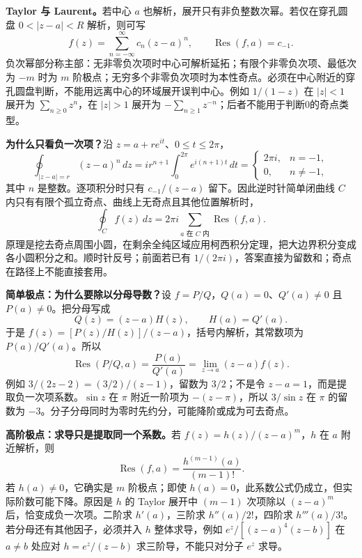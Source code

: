 \documentclass[11pt,a4paper,fontset=fandol]{ctexart}
\begin{document}
\textbf{Taylor 与 Laurent。}若中心 $a$ 也解析，展开只有非负整数次幂。若仅在穿孔圆盘 $0<|z-a|<R$ 解析，则可写
\begin{equation}
f(z)=\sum_{n=-\infty}^{\infty}c_n(z-a)^n,\qquad \operatorname{Res}(f,a)=c_{-1}.
\label{review:laurent}
\end{equation}
负次幂部分称主部：无非零负次项时中心可解析延拓；有限个非零负次项、最低次为 $-m$ 时为 $m$ 阶极点；无穷多个非零负次项时为本性奇点。必须在中心附近的穿孔圆盘判断，不能用远离中心的环域展开误判中心。例如 $1/(1-z)$ 在 $|z|<1$ 展开为 $\sum_{n\ge0}z^n$，在 $|z|>1$ 展开为 $-\sum_{n\ge1}z^{-n}$；后者不能用于判断0的奇点类型。

\textbf{为什么只看负一次项？}沿 $z=a+re^{it}$、$0\le t\le2\pi$，
\[
\oint_{|z-a|=r}(z-a)^n\,dz=ir^{n+1}\int_0^{2\pi}e^{i(n+1)t}\,dt
=\begin{cases}2\pi i,&n=-1,\\0,&n\ne-1,\end{cases}
\]
其中 $n$ 是整数。逐项积分时只有 $c_{-1}/(z-a)$ 留下。因此逆时针简单闭曲线 $C$ 内只有有限个孤立奇点、曲线上无奇点且其他位置解析时，
\begin{equation}
\oint_C f(z)\,dz=2\pi i\sum_{a\text{ 在 }C\text{ 内}}\operatorname{Res}(f,a).
\label{review:residue-theorem}
\end{equation}
原理是挖去奇点周围小圆，在剩余全纯区域应用柯西积分定理，把大边界积分变成各小圆积分之和。顺时针反号；前面若已有 $1/(2\pi i)$，答案直接为留数和；奇点在路径上不能直接套用。

\textbf{简单极点：为什么要除以分母导数？}设 $f=P/Q$，$Q(a)=0$、$Q'(a)\ne0$ 且 $P(a)\ne0$。把分母写成
\[
Q(z)=(z-a)H(z),\qquad H(a)=Q'(a).
\]
于是 $f(z)=[P(z)/H(z)]/(z-a)$，括号内解析，其常数项为 $P(a)/Q'(a)$。所以
\begin{equation}
\operatorname{Res}(P/Q,a)=\frac{P(a)}{Q'(a)}
=\lim_{z\to a}(z-a)f(z).
\label{review:simple-residue}
\end{equation}
例如 $3/(2z-2)=(3/2)/(z-1)$，留数为 $3/2$；不是令 $z-a=1$，而是提取负一次项系数。$\sin z$ 在 $\pi$ 附近一阶项为 $-(z-\pi)$，所以 $3/\sin z$ 在 $\pi$ 的留数为 $-3$。分子分母同时为零时先约分，可能降阶或成为可去奇点。

\textbf{高阶极点：求导只是提取同一个系数。}若 $f(z)=h(z)/(z-a)^m$，$h$ 在 $a$ 附近解析，则
\begin{equation}
\operatorname{Res}(f,a)=\frac{h^{(m-1)}(a)}{(m-1)!}.
\label{review:higher-residue}
\end{equation}
若 $h(a)\ne0$，它确实是 $m$ 阶极点；即使 $h(a)=0$，此系数公式仍成立，但实际阶数可能下降。原因是 $h$ 的 Taylor 展开中 $(m-1)$ 次项除以 $(z-a)^m$ 后，恰变成负一次项。二阶求 $h'(a)$，三阶求 $h''(a)/2!$，四阶求 $h'''(a)/3!$。若分母还有其他因子，必须并入 $h$ 整体求导，例如 $e^z/[(z-a)^4(z-b)]$ 在 $a\ne b$ 处应对 $h=e^z/(z-b)$ 求三阶导，不能只对分子 $e^z$ 求导。
\end{document}
